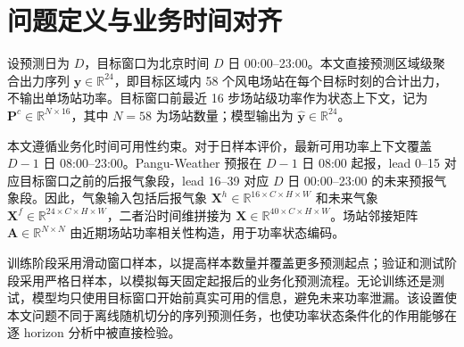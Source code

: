 \section{问题定义与业务时间对齐}

设预测日为 \(D\)，目标窗口为北京时间 \(D\) 日 00:00--23:00。本文直接预测区域级聚合出力序列 \(\mathbf{y}\in\mathbb{R}^{24}\)，即目标区域内 58 个风电场站在每个目标时刻的合计出力，不输出单场站功率。目标窗口前最近 16 步场站级功率作为状态上下文，记为 \(\mathbf{P}^{c}\in\mathbb{R}^{N\times16}\)，其中 \(N=58\) 为场站数量；模型输出为 \(\hat{\mathbf{y}}\in\mathbb{R}^{24}\)。

本文遵循业务化时间可用性约束。对于日样本评价，最新可用功率上下文覆盖 \(D-1\) 日 08:00--23:00。Pangu-Weather 预报在 \(D-1\) 日 08:00 起报，lead 0--15 对应目标窗口之前的后报气象段，lead 16--39 对应 \(D\) 日 00:00--23:00 的未来预报气象段。因此，气象输入包括后报气象 \(\mathbf{X}^{h}\in\mathbb{R}^{16\times C\times H\times W}\) 和未来气象 \(\mathbf{X}^{f}\in\mathbb{R}^{24\times C\times H\times W}\)，二者沿时间维拼接为 \(\mathbf{X}\in\mathbb{R}^{40\times C\times H\times W}\)。场站邻接矩阵 \(\mathbf{A}\in\mathbb{R}^{N\times N}\) 由近期场站功率相关性构造，用于功率状态编码。

训练阶段采用滑动窗口样本，以提高样本数量并覆盖更多预测起点；验证和测试阶段采用严格日样本，以模拟每天固定起报后的业务化预测流程。无论训练还是测试，模型均只使用目标窗口开始前真实可用的信息，避免未来功率泄漏。该设置使本文问题不同于离线随机切分的序列预测任务，也使功率状态条件化的作用能够在逐 horizon 分析中被直接检验。
